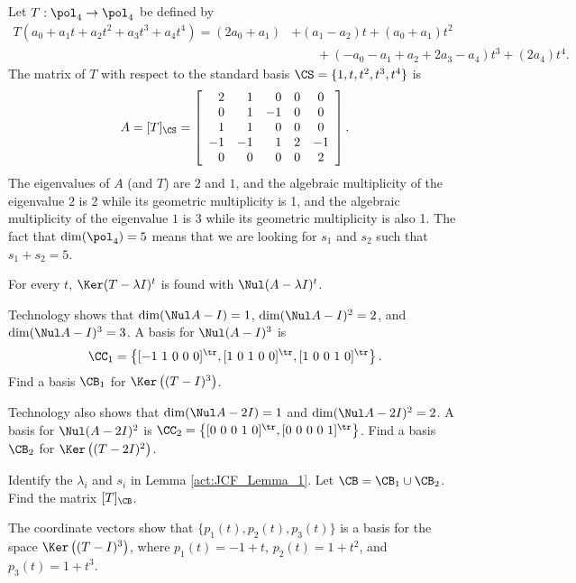 \begin{activity} \label{act:JCF_Lemma_1} Let $T:\pol_4 \to \pol_4$ be defined by 
\begin{align*}
T\left(a_0+a_1t+a_2t^2+a_3t^3+a_4t^4\right) = (2a_0+a_1) &+ (a_1-a_2)t + (a_0+a_1)t^2 \\
	&\qquad + (-a_0-a_1+a_2+2a_3-a_4)t^3 + (2a_4)t^4.
\end{align*}
The matrix of $T$ with respect to the standard basis $\CS = \{1,t,t^2,t^3,t^4\}$ is 
\[A = [T]_{\CS} = \left[ \begin{array}{rrrcc} 2&1&0&0&0\\0&1&-1&0&0 \\ 1&1&0&0&0 \\ -1&-1&1&2&-1 \\ 0&0&0&0&2 \end{array} \right].\]
The eigenvalues of $A$ (and $T$) are $2$ and $1$, and the algebraic multiplicity of the eigenvalue $2$ is 2 while its geometric multiplicity is 1, and the algebraic multiplicity of the eigenvalue $1$ is 3 while its geometric multiplicity is also 1. The fact that $\dim(\pol_4) = 5$ means that we are looking for $s_1$ and $s_2$ such that $s_1+s_2 = 5$. 

For every $t$, $\Ker(T-\lambda I)^t$ is found with $\Nul (A- \lambda I)^t$. 
\ba
\item Technology shows that $\dim(\Nul A-I) = 1$, $\dim(\Nul A-I)^2 = 2$, and $\dim(\Nul A-I)^3 = 3$. A basis for $\Nul (A-I)^3$ is 
\[\CC_1 = \left\{ [-1 \ 1 \ 0 \ 0 \ 0]^{\tr}, [1 \ 0 \ 1 \ 0 \ 0]^{\tr},  [1 \ 0 \ 0 \ 1 \ 0]^{\tr}\right\}.\] 
Find a basis $\CB_1$ for $\Ker\left((T-I)^3\right)$.

\item Technology also shows that $\dim(\Nul A-2I) = 1$ and $\dim(\Nul A-2I)^2 = 2$. A basis for $\Nul (A-2I)^2$ is $\CC_2 = \left\{ [0 \ 0 \ 0 \ 1 \ 0]^{\tr}, [0 \ 0 \ 0 \ 0 \ 1]^{\tr}\right\}$. Find a basis $\CB_2$ for $\Ker\left((T-2I)^2\right)$.

\item Identify the $\lambda_i$ and $s_i$ in Lemma \ref{act:JCF_Lemma_1}. Let $\CB = \CB_1 \cup \CB_2$. Find the matrix $[T]_{\CB}$. 

\ea

\end{activity}

\ActivitySolution
\ba
\item The coordinate vectors show that $\{p_1(t), p_2(t), p_3(t)\}$ is a basis for the space $\Ker\left((T-I)^3\right)$, where $p_1(t) = -1+t$, $p_2(t) = 1+t^2$, and $p_3(t)= 1+t^3$.

